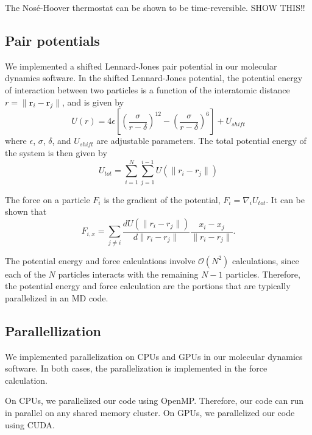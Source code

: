 \documentclass[12pt]{article}
\begin{document}
The Nos\'{e}-Hoover thermostat can be shown to be time-reversible. SHOW THIS!!

\subsection{Pair potentials} \label{subsec:potential}

We implemented a shifted Lennard-Jones pair potential in our molecular dynamics software.
%
In the shifted Lennard-Jones potential, the potential energy of interaction between two particles is a function of the interatomic distance $r = \|\mathbf{r}_i - \mathbf{r}_j \|$, and is given by 
\begin{equation}
U(r) = 4 \epsilon\left[ \left( \frac{\sigma}{r-\delta} \right)^{12} - \left( \frac{\sigma}{r-\delta} \right)^6 \right] + U_{shift}
\end{equation}
where $\epsilon$, $\sigma$, $\delta$, and $U_{shift}$ are adjustable parameters.
%
The total potential energy of the system is then given by
\begin{equation}
U_{tot} = \sum_{i=1}^{N} \sum_{j=1}^{i-1} U\left( \| r_i - r_j \| \right)
\end{equation}

The force on a particle $F_i$ is the gradient of the potential, $F_i = \nabla_i U_{tot}$.
%
It can be shown that 
\begin{equation}
F_{i, x} = \sum_{j \ne i} \frac{d U\left( \| r_i - r_j \| \right)}{d \| r_i - r_j \| } \frac{x_i - x_j}{\|r_i - r_j\|}.
\end{equation}

The potential energy and force calculations involve $\mathcal{O}(N^2)$ calculations, since each of the $N$ particles interacts with the remaining $N-1$ particles.
%
Therefore, the potential energy and force calculation are the portions that are typically parallelized in an MD code.

\subsection{Parallellization}

We implemented parallelization on CPUs and GPUs in our molecular dynamics software.
%
In both cases, the parallelization is implemented in the force calculation. 

On CPUs, we parallelized our code using OpenMP.
%
Therefore, our code can run in parallel on any shared memory cluster. 
%
On GPUs, we parallelized our code using CUDA.
\end{document}
